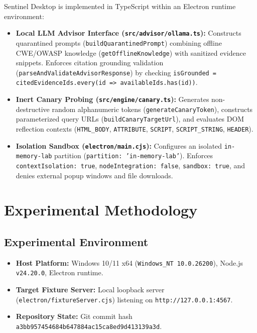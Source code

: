 \documentclass[conference]{IEEEtran}
\begin{document}
Sentinel Desktop is implemented in TypeScript within an Electron runtime environment:
\begin{itemize}
    \item \textbf{Local LLM Advisor Interface (\texttt{src/advisor/ollama.ts}):} Constructs quarantined prompts (\texttt{buildQuarantinedPrompt}) combining offline CWE/OWASP knowledge (\texttt{getOfflineKnowledge}) with sanitized evidence snippets. Enforces citation grounding validation (\texttt{parseAndValidateAdvisorResponse}) by checking \texttt{isGrounded = citedEvidenceIds.every(id => availableIds.has(id))}.
    \item \textbf{Inert Canary Probing (\texttt{src/engine/canary.ts}):} Generates non-destructive random alphanumeric tokens (\texttt{generateCanaryToken}), constructs parameterized query URLs (\texttt{buildCanaryTargetUrl}), and evaluates DOM reflection contexts (\texttt{HTML\_BODY}, \texttt{ATTRIBUTE}, \texttt{SCRIPT}, \texttt{SCRIPT\_STRING}, \texttt{HEADER}).
    \item \textbf{Isolation Sandbox (\texttt{electron/main.cjs}):} Configures an isolated \texttt{in-memory-lab} partition (\texttt{partition: 'in-memory-lab'}). Enforces \texttt{contextIsolation: true}, \texttt{nodeIntegration: false}, \texttt{sandbox: true}, and denies external popup windows and file downloads.
\end{itemize}

\section{Experimental Methodology}

\subsection{Experimental Environment}
\begin{itemize}
    \item \textbf{Host Platform:} Windows 10/11 x64 (\texttt{Windows\_NT 10.0.26200}), Node.js \texttt{v24.20.0}, Electron runtime.
    \item \textbf{Target Fixture Server:} Local loopback server (\texttt{electron/fixtureServer.cjs}) listening on \texttt{http://127.0.0.1:4567}.
    \item \textbf{Repository State:} Git commit hash \texttt{a3bb957454684b64}\allowbreak\texttt{7884ac15ca8ed9d413139a3d}.
\end{itemize}
\end{document}
